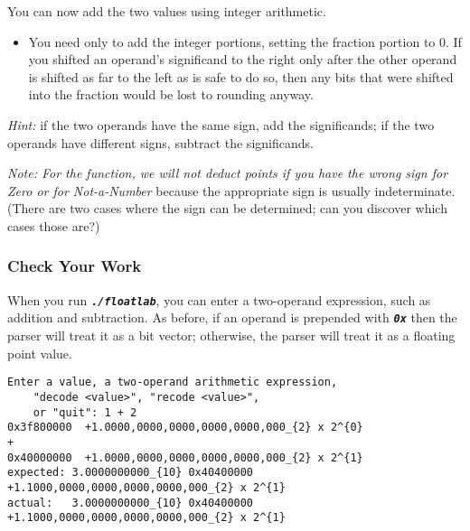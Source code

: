 You can now add the two values using integer arithmetic.
\begin{itemize}
    \item You need only to add the integer portions, setting the fraction portion to 0.
        If you shifted an operand's significand to the right only after the other operand is shifted as far to the left as is safe to do so, then any bits that were shifted into the fraction would be lost to rounding anyway.
\end{itemize}

\textit{Hint:} if the two operands have the same sign, add the significands;
if the two operands have different signs, subtract the significands.

\textit{Note: For the  function, we will not deduct points if you have the wrong sign for Zero or for Not-a-Number} because the appropriate sign is usually indeterminate.
(There are two cases where the sign can be determined; can you discover which cases those are?)


\subsubsection*{Check Your Work}

When you run \texttt{\textbf{\textit{./floatlab}}}, you can enter a two-operand expression, such as addition and subtraction.
As before, if an operand is prepended with \texttt{\textbf{\textit{0x}}} then the parser will treat it as a bit vector;
otherwise, the parser will treat it as a floating point value.

\begin{verbatim}
Enter a value, a two-operand arithmetic expression,
    "decode <value>", "recode <value>",
    or "quit": 1 + 2
0x3f800000	+1.0000,0000,0000,0000,0000,000_{2} x 2^{0}
+
0x40000000	+1.0000,0000,0000,0000,0000,000_{2} x 2^{1}
expected: 3.0000000000_{10}	0x40400000	+1.1000,0000,0000,0000,0000,000_{2} x 2^{1}
actual:   3.0000000000_{10}	0x40400000	+1.1000,0000,0000,0000,0000,000_{2} x 2^{1}
\end{verbatim}

